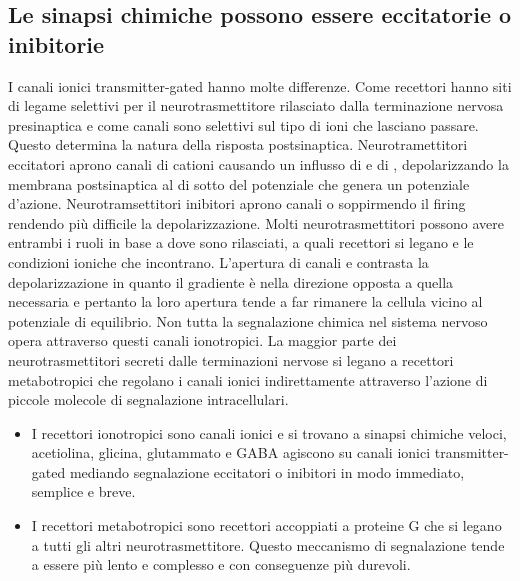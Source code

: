 \subsection{Le sinapsi chimiche possono essere eccitatorie o inibitorie}
I canali ionici transmitter-gated hanno molte differenze. Come recettori hanno siti di legame selettivi per il neurotrasmettitore rilasciato dalla terminazione nervosa presinaptica e
come canali sono selettivi sul tipo di ioni che lasciano passare. Questo determina la natura della risposta postsinaptica. Neurotramettitori eccitatori aprono canali di cationi causando
un influsso di  e di , depolarizzando la membrana postsinaptica al di sotto del potenziale che genera un potenziale d'azione. Neurotramsettitori inibitori aprono
canali  o  soppirmendo il firing rendendo pi\`u difficile la depolarizzazione. Molti neurotrasmettitori possono avere entrambi i ruoli in base a dove sono rilasciati, a
quali recettori si legano e le condizioni ioniche che incontrano. L'apertura di canali  e  contrasta la depolarizzazione in quanto il gradiente \`e nella direzione opposta
a quella necessaria e pertanto la loro apertura tende a far rimanere la cellula vicino al potenziale di equilibrio. Non tutta la segnalazione chimica nel sistema nervoso opera attraverso
questi canali ionotropici. La maggior parte dei neurotrasmettitori secreti dalle terminazioni nervose si legano a recettori metabotropici che regolano i canali ionici indirettamente
attraverso l'azione di piccole molecole di segnalazione intracellulari.
\begin{itemize}
	\item I recettori ionotropici sono canali ionici e si trovano a sinapsi chimiche veloci, acetiolina, glicina, glutammato e GABA agiscono su canali ionici transmitter-gated 
		mediando segnalazione eccitatori o inibitori in modo immediato, semplice e breve.
	\item I recettori metabotropici sono recettori accoppiati a proteine G che si legano a tutti gli altri neurotrasmettitore. Questo meccanismo di segnalazione tende a essere 
		pi\`u lento e complesso e con conseguenze pi\`u durevoli.
\end{itemize}
